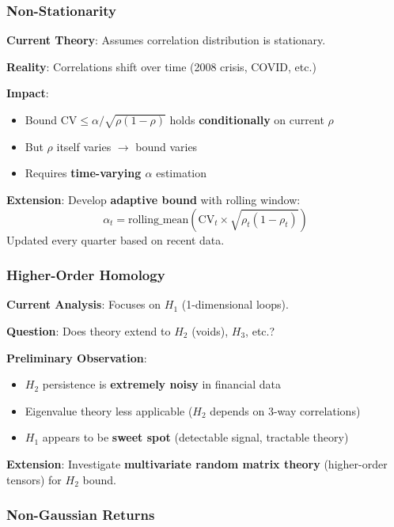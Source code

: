 \subsubsection{Non-Stationarity}

\textbf{Current Theory}: Assumes correlation distribution is stationary.

\textbf{Reality}: Correlations shift over time (2008 crisis, COVID, etc.)

\textbf{Impact}:
\begin{itemize}
\item Bound $\text{CV} \leq \alpha/\sqrt{\rho(1-\rho)}$ holds \textbf{conditionally} on current $\rho$
\item But $\rho$ itself varies $\rightarrow$ bound varies
\item Requires \textbf{time-varying $\alpha$} estimation
\end{itemize}

\textbf{Extension}: Develop \textbf{adaptive bound} with rolling window:
\begin{equation}
\alpha_t = \text{rolling\_mean}(\text{CV}_t \times \sqrt{\rho_t(1-\rho_t)})
\end{equation}
Updated every quarter based on recent data.

\subsubsection{Higher-Order Homology}

\textbf{Current Analysis}: Focuses on $H_1$ (1-dimensional loops).

\textbf{Question}: Does theory extend to $H_2$ (voids), $H_3$, etc.?

\textbf{Preliminary Observation}:
\begin{itemize}
\item $H_2$ persistence is \textbf{extremely noisy} in financial data
\item Eigenvalue theory less applicable ($H_2$ depends on 3-way correlations)
\item $H_1$ appears to be \textbf{sweet spot} (detectable signal, tractable theory)
\end{itemize}

\textbf{Extension}: Investigate \textbf{multivariate random matrix theory} (higher-order tensors) for $H_2$ bound.

\subsubsection{Non-Gaussian Returns}

